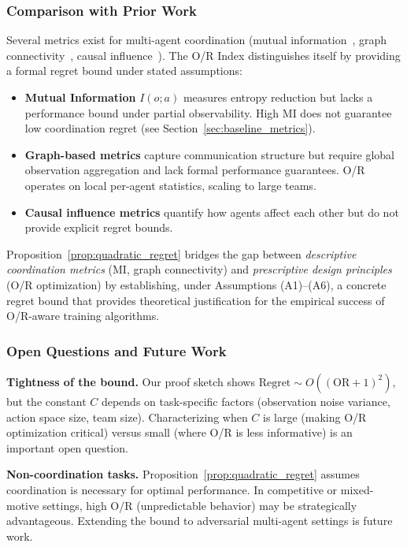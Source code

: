 \subsubsection{Comparison with Prior Work}

Several metrics exist for multi-agent coordination (mutual information~\citep{jaques2019social}, graph connectivity~\citep{wang2020graph}, causal influence~\citep{jaques2019causal}). The O/R Index distinguishes itself by providing a formal regret bound under stated assumptions:

\begin{itemize}
    \item \textbf{Mutual Information} $I(o; a)$ measures entropy reduction but lacks a performance bound under partial observability. High MI does not guarantee low coordination regret (see Section~\ref{sec:baseline_metrics}).
    \item \textbf{Graph-based metrics} capture communication structure but require global observation aggregation and lack formal performance guarantees. O/R operates on local per-agent statistics, scaling to large teams.
    \item \textbf{Causal influence metrics} quantify how agents affect each other but do not provide explicit regret bounds.
\end{itemize}

Proposition~\ref{prop:quadratic_regret} bridges the gap between \textit{descriptive coordination metrics} (MI, graph connectivity) and \textit{prescriptive design principles} (O/R optimization) by establishing, under Assumptions (A1)--(A6), a concrete regret bound that provides theoretical justification for the empirical success of O/R-aware training algorithms.

\subsubsection{Open Questions and Future Work}

\textbf{Tightness of the bound.} Our proof sketch shows $\text{Regret} \sim O((\text{OR}+1)^2)$, but the constant $C$ depends on task-specific factors (observation noise variance, action space size, team size). Characterizing when $C$ is large (making O/R optimization critical) versus small (where O/R is less informative) is an important open question.

\textbf{Non-coordination tasks.} Proposition~\ref{prop:quadratic_regret} assumes coordination is necessary for optimal performance. In competitive or mixed-motive settings, high O/R (unpredictable behavior) may be strategically advantageous. Extending the bound to adversarial multi-agent settings is future work.

